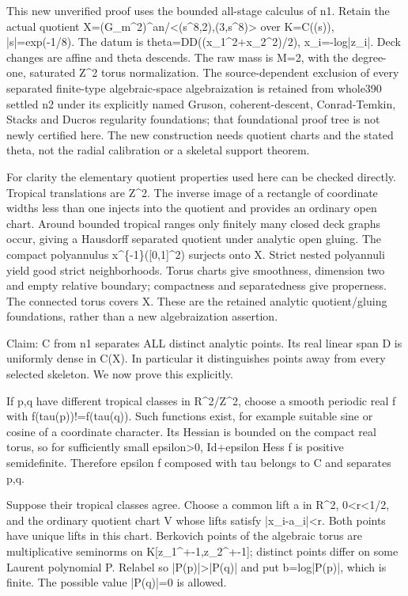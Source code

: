 \documentclass[11pt]{article}
\begin{document}
This new unverified proof uses the bounded all-stage calculus of n1. Retain the actual quotient X=(G\_m\textasciicircum{}2)\textasciicircum{}an/<(s\textasciicircum{}8,2),(3,s\textasciicircum{}8)> over K=C((s)), |s|=exp(-1/8). The datum is theta=DD((x\_1\textasciicircum{}2+x\_2\textasciicircum{}2)/2), x\_i=-log|z\_i|. Deck changes are affine and theta descends. The raw mass is M=2, with the degree-one, saturated Z\textasciicircum{}2 torus normalization. The source-dependent exclusion of every separated finite-type algebraic-space algebraization is retained from whole390 settled n2 under its explicitly named Gruson, coherent-descent, Conrad-Temkin, Stacks and Ducros regularity foundations; that foundational proof tree is not newly certified here. The new construction needs quotient charts and the stated theta, not the radial calibration or a skeletal support theorem.

For clarity the elementary quotient properties used here can be checked directly. Tropical translations are Z\textasciicircum{}2. The inverse image of a rectangle of coordinate widths less than one injects into the quotient and provides an ordinary open chart. Around bounded tropical ranges only finitely many closed deck graphs occur, giving a Hausdorff separated quotient under analytic open gluing. The compact polyannulus x\textasciicircum{}\{-1\}([0,1]\textasciicircum{}2) surjects onto X. Strict nested polyannuli yield good strict neighborhoods. Torus charts give smoothness, dimension two and empty relative boundary; compactness and separatedness give properness. The connected torus covers X. These are the retained analytic quotient/gluing foundations, rather than a new algebraization assertion.

Claim: C from n1 separates ALL distinct analytic points. Its real linear span D is uniformly dense in C(X). In particular it distinguishes points away from every selected skeleton. We now prove this explicitly.

If p,q have different tropical classes in R\textasciicircum{}2/Z\textasciicircum{}2, choose a smooth periodic real f with f(tau(p))!=f(tau(q)). Such functions exist, for example suitable sine or cosine of a coordinate character. Its Hessian is bounded on the compact real torus, so for sufficiently small epsilon>0, Id+epsilon Hess f is positive semidefinite. Therefore epsilon f composed with tau belongs to C and separates p,q.

Suppose their tropical classes agree. Choose a common lift a in R\textasciicircum{}2, 0<r<1/2, and the ordinary quotient chart V whose lifts satisfy |x\_i-a\_i|<r. Both points have unique lifts in this chart. Berkovich points of the algebraic torus are multiplicative seminorms on K[z\_1\textasciicircum{}+-1,z\_2\textasciicircum{}+-1]; distinct points differ on some Laurent polynomial P. Relabel so |P(p)|>|P(q)| and put b=log|P(p)|, which is finite. The possible value |P(q)|=0 is allowed.
\end{document}
